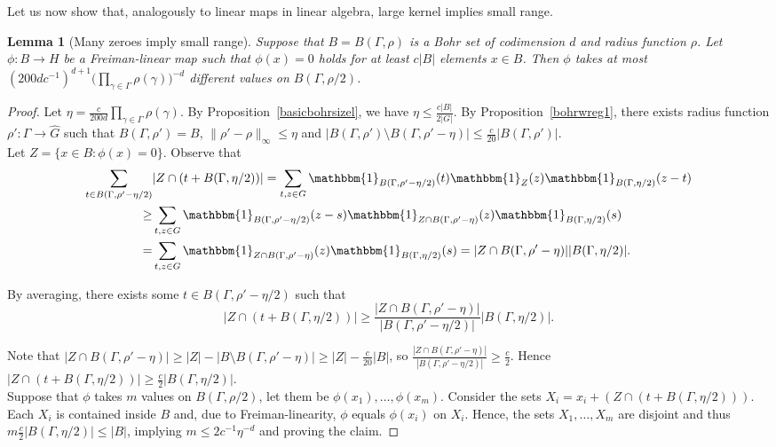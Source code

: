 \documentclass[a4paper,11pt]{article}
\numberwithin{theorem}{section}
\newtheorem{lemma}[theorem]{Lemma}
\theoremstyle{definition}
\newcommand\id{\mathbbm{1}}
\begin{document}
Let us now show that, analogously to linear maps in linear algebra, large kernel implies small range.

\begin{lemma}[Many zeroes imply small range]\label{smallrangelemma}
     Suppose that $B = B(\Gamma, \rho)$ is a Bohr set of codimension $d$ and radius function $\rho$. Let $\phi  : B \to H$ be a Freiman-linear map such that $\phi(x) = 0$ holds for at least $c |B|$ elements $x \in B$. Then $\phi$ takes at most $(200d c^{-1})^{d+1} \Big(\prod_{\gamma \in \Gamma} \rho(\gamma)\Big)^{-d}$ different values on $B(\Gamma, \rho/2)$.
\end{lemma}
    
\begin{proof}
    Let $\eta = \frac{c}{200d} \prod_{\gamma \in \Gamma} \rho(\gamma)$. By Proposition~\ref{basicbohrsizel}, we have $\eta \leq \frac{c|B|}{2 |G|}$. By Proposition~\ref{bohrwreg1}, there exists radius function $\rho' : \Gamma \to \hat{G}$ such that $B(\Gamma, \rho') = B$, $\|\rho' - \rho\|_\infty \leq \eta$ and $|B(\Gamma, \rho') \setminus B(\Gamma, \rho' - \eta)| \leq \frac{c}{20}|B(\Gamma, \rho')|$.\\
    
    Let $Z = \{x \in B: \phi(x) = 0\}$. Observe that
    \begin{align*}\sum_{t \in B(\Gamma, \rho' - \eta/2)}& |Z \cap (t + B(\Gamma, \eta/2))| = \sum_{t, z \in G} \id_{B(\Gamma, \rho' - \eta/2)}(t) \id_Z(z) \id_{B(\Gamma, \eta/2)}(z - t)\\
    \geq &\sum_{t, z \in G} \id_{B(\Gamma, \rho' - \eta/2)}(z - s) \id_{Z \cap B(\Gamma, \rho' - \eta)}(z) \id_{B(\Gamma, \eta/2)}(s) \\
    = &\sum_{t, z \in G} \id_{Z \cap B(\Gamma, \rho' - \eta)}(z) \id_{B(\Gamma, \eta/2)}(s) = |Z \cap B(\Gamma, \rho' - \eta)| |B(\Gamma, \eta/2)|.\end{align*}
    
    
    By averaging, there exists some $t \in B(\Gamma, \rho' - \eta/2)$ such that 
    \[|Z \cap (t + B(\Gamma, \eta/2))| \geq \frac{|Z \cap B(\Gamma, \rho' - \eta)|}{|B(\Gamma, \rho' - \eta/2)|}|B(\Gamma, \eta/2)|.\]

    Note that $|Z \cap B(\Gamma, \rho' - \eta)| \geq |Z| - |B \setminus B(\Gamma, \rho' - \eta)| \geq |Z| - \frac{c}{20}|B|$, so $\frac{|Z \cap B(\Gamma, \rho' - \eta)|}{|B(\Gamma, \rho' - \eta/2)|} \geq \frac{c}{2}$. Hence $|Z \cap (t + B(\Gamma, \eta/2))| \geq \frac{c}{2} |B(\Gamma, \eta/2)|$.\\
    
    Suppose that $\phi$ takes $m$ values on $B(\Gamma, \rho/2)$, let them be $\phi(x_1), \dots, \phi(x_m)$. Consider the sets $X_i = x_i + (Z \cap (t + B(\Gamma, \eta/2)))$. Each $X_i$ is contained inside $B$ and, due to Freiman-linearity, $\phi$ equals $\phi(x_i)$ on $X_i$. Hence, the sets $X_1, \dots, X_m$ are disjoint and thus $m \frac{c}{2}|B(\Gamma, \eta/2)| \leq |B|$, implying $m \leq 2c^{-1} \eta^{-d}$ and proving the claim. 
\end{proof}
\end{document}
